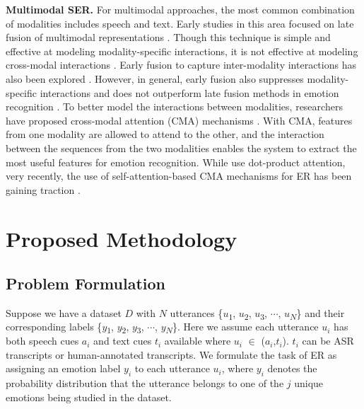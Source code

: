 \documentclass{INTERSPEECH2023}
\begin{document}
{\noindent \textbf{Multimodal SER.}} For multimodal approaches, the most common combination of modalities includes speech and text. Early studies in this area focused on late fusion of multimodal representations \cite{tripathi2018multi,poria2017context,wu2021emotion}. Though this technique is simple and effective at modeling modality-specific interactions, it is not effective at modeling cross-modal interactions \cite{wang2019words}. Early fusion to capture inter-modality interactions has also been explored \cite{sebastian2019fusion}. However, in general, early fusion also suppresses modality-specific interactions and does not outperform late fusion methods in emotion recognition \cite{wang2019words,poria2018multimodal}. To better model the interactions between modalities, researchers have proposed cross-modal attention (CMA) mechanisms \cite{choi2018convolutional,xu2019learning,krishna2020multimodal,chen2021key}. With CMA, features from one modality are allowed to attend to the other, and the interaction between the sequences from the two modalities enables the system to extract the most useful features for emotion recognition. While \cite{choi2018convolutional,xu2019learning} use dot-product attention, very recently, the use of self-attention-based CMA mechanisms for ER has been gaining traction \cite{krishna2020multimodal,pan2020multi,chen2021key}. 
























\section{Proposed Methodology}

\subsection{Problem Formulation}
Suppose we have a dataset $D$ with $N$ utterances \{$u$\textsubscript{$1$}, $u$\textsubscript{$2$}, $u$\textsubscript{$3$}, $\cdots$, $u$\textsubscript{$N$}\} and their corresponding labels \{$y$\textsubscript{$1$}, $y$\textsubscript{$2$}, $y$\textsubscript{$3$}, $\cdots$, $y$\textsubscript{$N$}\}. Here we assume each utterance $u_i$ has both speech cues $a_i$ and text cues $t_i$ available where $u_i$ $\in$ ($a_i$,$t_i$). $t_i$ can be ASR transcripts or human-annotated transcripts. We formulate the task of ER as assigning an emotion label $y_i$ to each utterance $u_i$, where $y_i$ denotes the probability distribution that the utterance belongs to one of the $j$ unique emotions being studied in the dataset.
\end{document}
